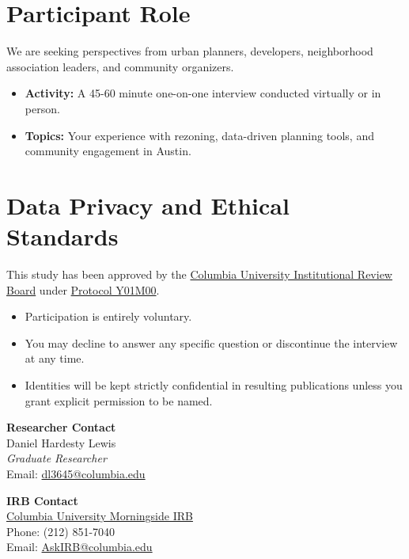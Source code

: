 \documentclass[10pt, letterpaper]{article}
\begin{document}
\section*{Participant Role}
We are seeking perspectives from urban planners, developers, neighborhood association leaders, and community organizers.
\begin{itemize}[leftmargin=1.5em, label={\color{columbiablue_official}\tiny$\blacksquare$}, parsep=0pt, itemsep=2pt, topsep=0pt]
    \item \textbf{Activity:} A 45-60 minute one-on-one interview conducted virtually or in person.
    \item \textbf{Topics:} Your experience with rezoning, data-driven planning tools, and community engagement in Austin.
\end{itemize}

\section*{Data Privacy and Ethical Standards}
This study has been approved by the \href{https://research.columbia.edu/institutional-review-board-morningside}{Columbia University Institutional Review Board} under \href{https://github.com/dhardestylewis/thesis/tree/main/Submitted/IRB_Submitted/Protocol_and_Submission}{Protocol Y01M00}.
\begin{itemize}[leftmargin=*, label={\color{columbiablue_official}\tiny$\blacksquare$}, parsep=2pt, itemsep=2pt, topsep=0pt]
    \item Participation is entirely voluntary.
    \item You may decline to answer any specific question or discontinue the interview at any time.
    \item Identities will be kept strictly confidential in resulting publications unless you grant explicit permission to be named.
\end{itemize}

\vfill

\noindent
\begin{minipage}[t]{0.48\textwidth}
\textbf{Researcher Contact} \\
Daniel Hardesty Lewis \\
\textit{Graduate Researcher} \\
Email: \href{mailto:dl3645@columbia.edu}{\color{columbiablue_official}dl3645@columbia.edu}
\end{minipage}
\hfill
\begin{minipage}[t]{0.48\textwidth}
\textbf{IRB Contact} \\
\href{https://research.columbia.edu/institutional-review-board-morningside}{Columbia University Morningside IRB} \\
Phone: (212) 851-7040 \\
Email: \href{mailto:AskIRB@columbia.edu}{\color{columbiablue_official}AskIRB@columbia.edu}
\end{minipage}
\end{document}
